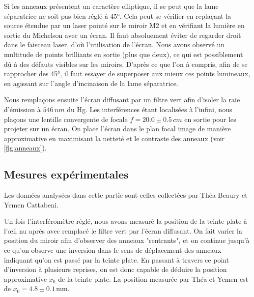 \documentclass{article}
\begin{document}
Si les anneaux présentent un caractère elliptique, il se peut que la lame séparatrice ne soit pas bien réglé 
à 45°. Cela peut se vérifier en replaçant la source étendue par un laser pointé sur le miroir M2 et en 
vérifiant la lumière en sortie du Michelson avec un écran. Il faut absoluement éviter de regarder droit dans le faisceau laser, d'où 
l'utilisation de l'écran. Nous avons observé un multitude de points brilliants en sortie (plus que deux), ce qui est possiblement dû à des défauts visibles 
sur les miroirs. D'après ce que l'on à compris, afin de se rapprocher des 45°, il faut essayer de superposer aux mieux ces points lumineaux, 
en agissant sur l'angle d'incinaison de la lame séparatrice.

Nous remplaçons ensuite l'écran diffusant par un filtre vert afin d'isoler la raie d'émission à $546 \,\unit{nm}$ du Hg. 
Les interférences étant localisées à l'infini, nous plaçons une lentille convergente de focale $f = 20.0 \pm 0.5 \,\unit{cm}$ en sortie pour les projeter 
sur un écran. On place l'écran dans le plan focal image de manière approximative en maximisant la netteté et le contraste des anneaux (voir \ref{fig:anneaux}).

\subsection{Mesures expérimentales}

Les données analysées dans cette partie sont celles collectées par Théa Beaury et Yemen Cattabeni.


Un fois l'interféromètre réglé, nous avons measuré la position de la teinte plate à l'œil nu après avec remplacé le filtre vert par l'écran diffusant.
On fait varier la position du miroir afin d'observer des anneaux "rentrants", et on continue jusqu'à ce qu'on observe une inversion 
dans le sens de déplacement des anneaux - indiquant qu'on est passé par la teinte plate. En passant à travers ce point d'inversion
à plusieurs reprises, on est donc capable de déduire la position approximative $x_0$ de la teinte plate. La position measurée par Théa et Yemen
est de $x_0 = 4.8 \pm 0.1 \,\textrm{mm}$.
\end{document}
